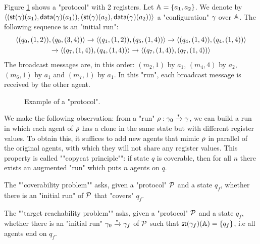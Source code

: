\begin{example}\label{ex:example-1}
	Figure \ref{fig:ex1} shows a "protocol" with 2 registers. 
	Let $\mathbb{A} = \{a_1, a_2\}$. We denote by $\langle (\mathsf{st}(\gamma)(a_1), \mathsf{data}(\gamma)(a_1)), (\mathsf{st}(\gamma)(a_2),\mathsf{data}(\gamma)(a_2)) \rangle$ a "configuration" $\gamma$ over $\mathbb{A}$. The following sequence is an "initial run":\vspace{-0.2cm}
	\begin{multline*}
	\langle (q_0, (1,2)), (q_0,(3,4)) \rangle \xrightarrow{} \langle (q_1, (1,2)), (q_5,(1,4)) \rangle \xrightarrow{} 
	\langle (q_4, (1,4)), (q_4,(1,4)) \rangle \\ \xrightarrow{} \langle (q_7, (1,4)), (q_4,(1,4)) \rangle \xrightarrow{} \langle (q_7, (1,4)), (q_7,(1,4)) \rangle
	\end{multline*}
	The broadcast messages are, in this order: $(m_2,1)$ by $a_1$, $(m_4,4)$ by $a_2$, $(m_6,1)$ by $a_1$ and $(m_7,1)$ by $a_1$. In this "run", each broadcast message is received by the other agent. 
\end{example}

\begin{figure}[t]
	\centering
	\resizebox*{!}{3.2cm}{
		
	}
	\caption{Example of a "protocol".}\label{fig:ex1}
\end{figure}
	
	


\begin{remark}
	\label{rem:copycat-principle}
	We make the following observation: from a "run" $\rho : \gamma_0 \xrightarrow{\ast} \gamma$, we can build a run in which each agent of $\rho$ has  a clone in the same state but with different register values. To obtain this, it suffices to add new agents that mimic $\rho$ in parallel of the original agents, with which they will not share any register values.  This property is called ""copycat principle"": if state $q$ is coverable, then for all $n$ there exists an augmented "run" which puts $n$ agents on $q$.
\end{remark}

	
\begin{definition}

	\AP The ""coverability problem"" \COVER asks, given a "protocol" $\mathcal{P}$ and a state $q_f$, whether there is an "initial run" of $\mathcal{P}$ that "covers" $q_f$.
	
	\AP The ""target reachability problem"" \TARGET asks, given a "protocol" $\mathcal{P}$ and a state $q_f$, whether there is an "initial run" $\gamma_0 \xrightarrow{*} \gamma_f$ of $\mathcal{P}$ such that $\mathsf{st}(\gamma_f)(\mathbb{A}) = \{q_f\}$, i.e all agents end on $q_f$.
\end{definition}

